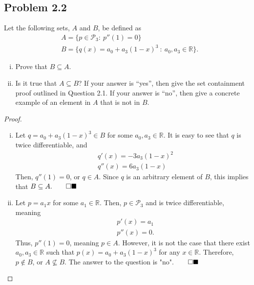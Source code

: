 \subsection*{Problem 2.2}
Let the following sets, $A$ and $B$, be defined as
	\begin{align*}
		&A = \{  p\in\mathcal{P}_3 :\ p''(1)=0  \}\\
		&B = \{  q(x) = a_0 + a_3(1-x)^3\ :\ a_0,a_3\in\mathbb{R}  \}.
	\end{align*}

	\begin{enumerate}[(i)]
		\item Prove that $B\subseteq A$.
		\item Is it true that $A\subseteq B$?  If your answer is ``yes'', then give the set containment proof outlined in Question 2.1.  If your answer is ``no'', then give a concrete example of an element in $A$ that is not in $B$.
	\end{enumerate}
\renewcommand\qedsymbol{}
\begin{proof}
\begin{enumerate}[(i)]
    
    \item Let $q = a_0 + a_3(1-x)^3\in B$ for some $a_0, a_3\in \mathbb{R}$. It is easy to see that $q$ is twice differentiable, and
    \[
    \begin{aligned}
        &q'(x)  = -3a_3(1-x)^2\\
        &q''(x) = 6a_3(1-x)
    \end{aligned}
    \]
    Then, $q''(1) = 0$, or $q\in A$. Since $q$ is an arbitrary element of $B$, this implies that $B\subseteq A.\qed{\blacksquare}$
    \item Let $p = a_1x$ for some $a_1\in\mathbb{R}$. Then, $p\in \mathcal{P}_3$ and is twice differentiable, meaning
    \[
    \begin{aligned}
        &p'(x) = a_1\\
        &p''(x) = 0.
    \end{aligned}
    \]
    Thus, $p''(1) = 0$, meaning $p\in A$. However, it is not the case that there exist $a_0, a_3\in\mathbb{R}$ such that $p(x) = a_0 + a_3(1-x)^3$ for any $x\in\mathbb{R}$. Therefore, $p\not\in B$, or $A\not\subseteq B$. The answer to the question is "no".$\qed{\blacksquare}$

\end{enumerate}
\end{proof}